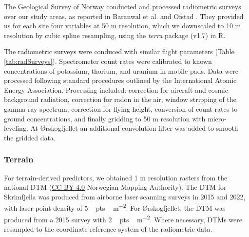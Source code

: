 \documentclass[soil, manuscript]{copernicus}
\begin{document}
The Geological Survey of Norway conducted and processed radiometric surveys over our study areas, as reported in Baranwal et al. \citeyearpar{baranwalHelicopterborneMagneticElectromagnetic2013} and Ofstad \citeyearpar{ofstadHelicopterborneMagneticRadiometric2015}.
They provided us for each site four variables at 50 m resolution, which we downscaled to 10 m resolution by cubic spline resampling, using the \emph{terra} package (v1.7) in R.

The radiometric surveys were conduced with similar flight parameters (Table \ref{tab:radSurveys}).
Spectrometer count rates were calibrated to known concentrations of potassium, thorium, and uranium in mobile pads.
Data were processed following standard procedures outlined by the International Atomic Energy Association.
Processing included: correction for aircraft and cosmic background radiation, correction for radon in the air, window stripping of the gamma ray spectrum, correction for flying height, conversion of count rates to ground concentrations, and finally gridding to 50 m resolution with micro-leveling.
At Ørskogfjellet an additional convolution filter was added to smooth the gridded data.

\subsubsection{Terrain}

For terrain-derived predictors, we obtained 1 m resolution rasters from the national DTM (\href{https://creativecommons.org/licenses/by/4.0/}{CC BY 4.0} Norwegian Mapping Authority).
The DTM for Skrimfjella was produced from airborne laser scanning surveys in 2015 and 2022, with laser point density of \unit{5\,pts\,m^{-2}}.
For Ørskogfjellet, the DTM was produced from a 2015 survey with \unit{2\,pts\,m^{-2}}.
Where necessary, DTMs were resampled to the coordinate reference system of the radiometric data.
\end{document}
